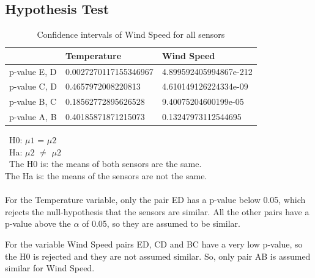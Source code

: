 \documentclass{article}
\begin{document}
    \subsection{Hypothesis Test}
        \begin{table}[H]
            \caption {Confidence intervals of Wind Speed for all sensors}
            \begin{tabular}{lll}
                        & Temperature             & Wind Speed  \\ \hline
            p-value E, D & 0.0027270117155346967 & 4.899592405994867e-212  \\ 
            p-value C, D & 0.4657972008220813 & 4.610149126224334e-09  \\
            p-value B, C & 0.18562772895626528 & 9.40075204600199e-05  \\
            p-value A, B & 0.40185871871215073 & 0.13247973112544695 
            \end{tabular}
        \end{table}

        \ H0: $\mu 1$ = $\mu 2$ \ \\
        \ Ha: $\mu 2$ $\ne$ $\mu 2$ \\\
        The H0 is: the means of both sensors are the same. \\
        The Ha is: the means of the sensors are not the same. \\ \\
        For the Temperature variable, only the pair ED has a p-value below 0.05, which rejects 
        the null-hypothesis that the sensors are similar. All the other pairs have a p-value above
        the $\alpha$ of 0.05, so they are assumed to be similar. 
        \par For the variable Wind Speed pairs ED, CD and BC have a very low p-value, so the H0
        is rejected and they are not assumed similar. So, only pair AB is assumed similar for Wind Speed.

    
       
\end{document}
